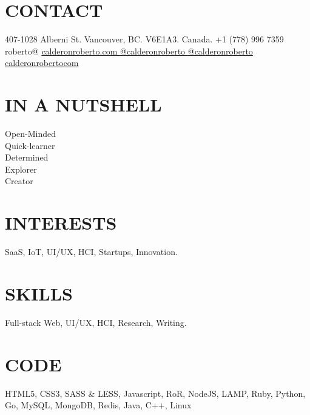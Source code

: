 \documentclass[full]{rvca}
\begin{document}

\begin{aside} %
\section{\uppercase{contact} }
407-1028 Alberni St.
Vancouver, BC.
V6E1A3. Canada.
+1 (778) 996 7359
\ghost
roberto@
\href{http://calderonroberto.com}{\color{sidebandtextcolor}calderonroberto.com \faGlobe}
\href{http://twitter.com/calderonroberto}{\color{sidebandtextcolor}@calderonroberto \faTwitter} 
\href{https://github.com/calderonroberto}{\color{sidebandtextcolor}@calderonroberto \faGithub} 
\href{https://ca.linkedin.com/in/calderonrobertocom}{\color{sidebandtextcolor}calderonrobertocom \faLinkedin} 
\ghost
\ghost
\section{\uppercase{in a nutshell}}
Open-Minded\\Quick-learner\\Determined\\Explorer\\Creator 
% 
\section{\uppercase{interests}}
SaaS, IoT, UI/UX, HCI, Startups, Innovation.
%
\section{\uppercase{skills}}
Full-stack Web, UI/UX, 
HCI, Research, Writing.
% 
\section{\uppercase{code}}
HTML5, CSS3, SASS \& LESS, {\scriptsize\faHeart} Javascript, 
{\scriptsize\faHeart} RoR, {\scriptsize\faHeart} NodeJS, LAMP,
{\scriptsize\faHeart} Ruby, Python, {\scriptsize\faHeart} Go,
MySQL, MongoDB, Redis,
Java, C++, {\scriptsize\faHeart} Linux
\end{aside}


\end{document}

